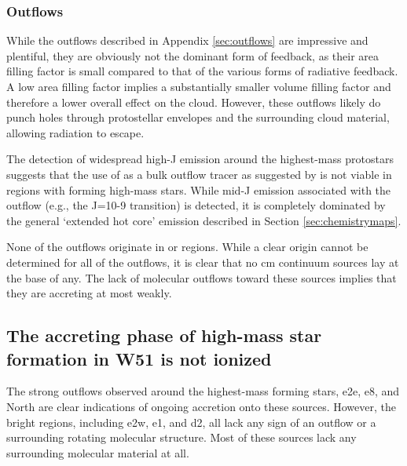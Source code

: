 \documentclass{emulateapj}
\begin{document}
\subsubsection{Outflows}
\label{sec:outflowdiscussion}
While the outflows described in Appendix \ref{sec:outflows} are impressive and
plentiful, they are obviously not the dominant form of feedback, as their area
filling factor is small compared to that of the various forms of radiative
feedback.  A low area filling factor implies a substantially smaller volume
filling factor and therefore a lower overall effect on the cloud.  However,
these outflows likely do punch holes through protostellar envelopes and the
surrounding cloud material, allowing radiation to escape.

The detection of widespread high-J \methanol emission around the highest-mass
protostars suggests that the use of \methanol as a bulk outflow tracer as
suggested by \citet{Kristensen2015a} is not viable in regions with forming
high-mass stars.  While mid-J \methanol emission associated with
the outflow (e.g., the J=10-9 transition) is detected, it is completely
dominated by the general `extended hot core' emission described in Section
\ref{sec:chemistrymaps}.

None of the outflows originate in \uchii or \hchii regions.  While a clear
origin cannot be determined for all of the outflows, it is clear that no cm
continuum sources lay at the base of any.  The lack of molecular outflows
toward these sources implies that they are accreting at most weakly.
% 

\subsection{The accreting phase of high-mass star formation in W51 is not ionized}
\label{sec:accretionandoutflows}
The strong outflows observed around the highest-mass forming stars, e2e, e8,
and North are clear indications of ongoing accretion onto these sources.
However, the bright \hii regions, including e2w, e1, and d2, all lack any sign
of an outflow or a surrounding rotating molecular structure.  Most of these
sources lack any surrounding molecular material at all.
\end{document}
